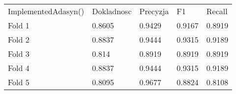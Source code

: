\begin{tabular}{lllll}
\hline
 ImplementedAdasyn() & Dokladnosc & Precyzja & F1     & Recall \\
 Fold 1              & 0.8605     & 0.9429   & 0.9167 & 0.8919 \\
 Fold 2              & 0.8837     & 0.9444   & 0.9315 & 0.9189 \\
 Fold 3              & 0.814      & 0.8919   & 0.8919 & 0.8919 \\
 Fold 4              & 0.8837     & 0.9444   & 0.9315 & 0.9189 \\
 Fold 5              & 0.8095     & 0.9677   & 0.8824 & 0.8108 \\
\hline
\end{tabular}